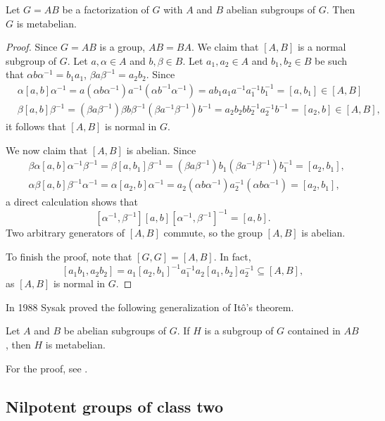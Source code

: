 \begin{theorem}[It\^o]
\label{theorem:Ito}
Let $G=AB$ be a factorization of $G$ with $A$ and $B$ abelian 
subgroups of $G$. Then $G$ is metabelian.
\end{theorem}

\begin{proof}
Since $G=AB$ is a group, $AB=BA$. We claim that $[A,B]$ is a normal subgroup 
of $G$. Let $a,\alpha\in A$ and $b,\beta\in B$. Let  $a_1,a_2\in A$ and 
	$b_1,b_2\in B$ be such that $\alpha b\alpha^{-1}=b_1a_1$, $\beta
	a\beta^{-1}=a_2b_2$. Since 
	\begin{align*}
		&\alpha[a,b]\alpha^{-1}=a(\alpha b\alpha^{-1})a^{-1}(\alpha b^{-1}\alpha^{-1})=ab_1a_1a^{-1}a_1^{-1}b_1^{-1}=[a,b_1]\in [A,B]\\
		&\beta[a,b]\beta^{-1}=(\beta a\beta^{-1})\beta b\beta^{-1}(\beta a^{-1}\beta^{-1})b^{-1}=a_2b_2bb_2^{-1}a_2^{-1}b^{-1}=[a_2,b]\in [A,B],
	\end{align*}
	it follows that $[A,B]$ is normal in $G$. 

	We now claim that $[A,B]$ is abelian. Since 
	\begin{align*}
		&\beta\alpha[a,b]\alpha^{-1}\beta^{-1} = \beta[a,b_1]\beta^{-1}=(\beta a\beta^{-1})b_1(\beta a^{-1}\beta^{-1})b_1^{-1}=[a_2,b_1],\\
		&\alpha\beta[a,b]\beta^{-1}\alpha^{-1} = \alpha[a_2,b]\alpha^{-1}=a_2(\alpha b\alpha^{-1})a_2^{-1}(\alpha b\alpha^{-1})=[a_2,b_1],
	\end{align*}
	a direct calculation shows that 
	\[
		[\alpha^{-1},\beta^{-1}][a,b][\alpha^{-1},\beta^{-1}]^{-1}=[a,b].
	\]
	Two arbitrary generators of $[A,B]$ commute, so the group $[A,B]$ is abelian. 
	
	To finish the proof, note that $[G,G]=[A,B]$. In fact, 
	\[
	[a_1b_1,a_2b_2]=a_1[a_2,b_1]^{-1}a_1^{-1}a_2[a_1,b_2]a_2^{-1}\subseteq [A,B],
	\]
	as $[A,B]$ is normal in $G$. 
\end{proof}

In 1988 Sysak proved the following generalization 
of It\^o's theorem.  

\begin{theorem}[Sysak]
    Let $A$ and $B$ be abelian subgroups of $G$. If $H$ is a subgroup of 
    $G$ contained in 
    $AB$, then $H$ is metabelian. 
\end{theorem}

For the proof, see \cite{MR988177}.

\subsection{Nilpotent groups of class two}

